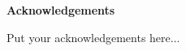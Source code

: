 \begin{center}
\textbf{\large Acknowledgements}
\end{center}

Put your acknowledgements here...


%

